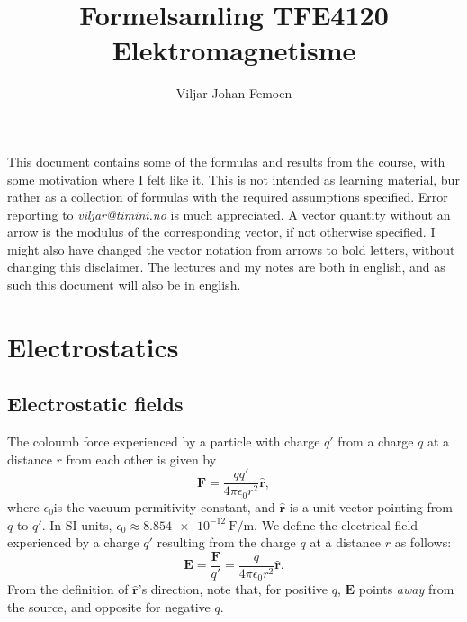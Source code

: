 \documentclass[a4paper, 12pt]{article}
\title{Formelsamling TFE4120 Elektromagnetisme}
\renewcommand{\vec}[1]{\mathbf{#1}}
\newcommand{\E}{\ensuremath{\vec{E}}}
\newcommand{\e}{\ensuremath{\epsilon_0}}
\let\tmp\hat
\renewcommand{\hat}[1]{\vec{\tmp{#1}}}
\begin{document}
\author{Viljar Johan Femoen} %

\flushbottom
\maketitle
\thispagestyle{empty}
\vskip 20pt
\vskip 2pt
\noindent This document contains some of the formulas and results from the course, with some motivation where I felt like it. 
This is not intended as learning material, bur rather as a collection of formulas with the required assumptions specified. 
Error reporting to \textit{viljar@timini.no} is much appreciated. 
A vector quantity without an arrow is the modulus of the corresponding vector, if not otherwise specified. 
I might also have changed the vector notation from arrows to bold letters, without changing this disclaimer. 
The lectures and my notes are both in english, and as such this document will also be in english.

\tableofcontents

\section{Electrostatics}
\subsection{Electrostatic fields}
    The coloumb force experienced by a particle with charge $q'$ from a charge $q$ at a distance $r$ from each other is given by 
    \begin{equation}
        \vec{F} = \frac{qq'}{4\pi\e r^2}\hat{r},
    \end{equation}
    where \e is the vacuum permitivity constant, and $\hat{r}$ is a unit vector pointing from $q$ to $q'$. 
    In SI units, $\e \approx \SI{8.854e-12}{\farad \per \metre}$.
    We define the electrical field experienced by a charge $q'$ resulting from the charge $q$ at a distance $r$ as follows:
    \begin{equation}
        \E = \frac{\vec{F}}{q'} = \frac{q}{4\pi\e r^2}\hat{r}.
    \end{equation}
    From the definition of $\hat{r}$'s direction, note that, for positive $q$, 
    \E{} points \textit{away} from the source, and opposite for negative $q$.
    
\end{document}

